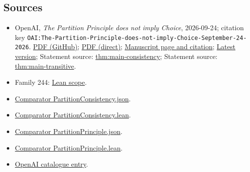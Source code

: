 \documentclass[11pt]{article}
\begin{document}
\subsection{Sources}
\begin{itemize}
\item OpenAI, \emph{The Partition Principle does not imply Choice}, 2026-09-24; citation key \texttt{OAI:The-Partition-Principle-does-not-imply-Choice-September-24-2026}. \href{https://github.com/openai/math/blob/adc7f1241b42e322a6451854ab7e4b4c146bf78a/preprints/The-Partition-Principle-does-not-imply-Choice-September-24-2026/partition-principle-without-choice.pdf}{PDF (GitHub)}; \href{https://github.com/openai/math/raw/adc7f1241b42e322a6451854ab7e4b4c146bf78a/preprints/The-Partition-Principle-does-not-imply-Choice-September-24-2026/partition-principle-without-choice.pdf}{PDF (direct)}; \href{https://github.com/openai/math/blob/adc7f1241b42e322a6451854ab7e4b4c146bf78a/preprints/The-Partition-Principle-does-not-imply-Choice-September-24-2026/README.md}{Manuscript page and citation}; \href{https://github.com/openai/math/blob/main/preprints/The-Partition-Principle-does-not-imply-Choice-September-24-2026/partition-principle-without-choice.pdf}{Latest version}; Statement source: \href{https://github.com/openai/math/blob/adc7f1241b42e322a6451854ab7e4b4c146bf78a/preprints/The-Partition-Principle-does-not-imply-Choice-September-24-2026/build/sections/introduction.tex\#L23}{thm:main-consistency}; Statement source: \href{https://github.com/openai/math/blob/adc7f1241b42e322a6451854ab7e4b4c146bf78a/preprints/The-Partition-Principle-does-not-imply-Choice-September-24-2026/build/sections/introduction.tex\#L29}{thm:main-transitive}.
\item Family 244: \href{https://github.com/openai/math/blob/adc7f1241b42e322a6451854ab7e4b4c146bf78a/lean/docs/244.md}{Lean scope}.
\item \href{https://github.com/openai/math/blob/adc7f1241b42e322a6451854ab7e4b4c146bf78a/lean/ComparatorChallenges/PartitionConsistency.json}{Comparator PartitionConsistency.json}.
\item \href{https://github.com/openai/math/blob/adc7f1241b42e322a6451854ab7e4b4c146bf78a/lean/ComparatorChallenges/PartitionConsistency.lean}{Comparator PartitionConsistency.lean}.
\item \href{https://github.com/openai/math/blob/adc7f1241b42e322a6451854ab7e4b4c146bf78a/lean/ComparatorChallenges/PartitionPrinciple.json}{Comparator PartitionPrinciple.json}.
\item \href{https://github.com/openai/math/blob/adc7f1241b42e322a6451854ab7e4b4c146bf78a/lean/ComparatorChallenges/PartitionPrinciple.lean}{Comparator PartitionPrinciple.lean}.
\item \href{https://github.com/openai/math/blob/adc7f1241b42e322a6451854ab7e4b4c146bf78a/CONTENTS.md}{OpenAI catalogue entry}.
\end{itemize}
\end{document}
